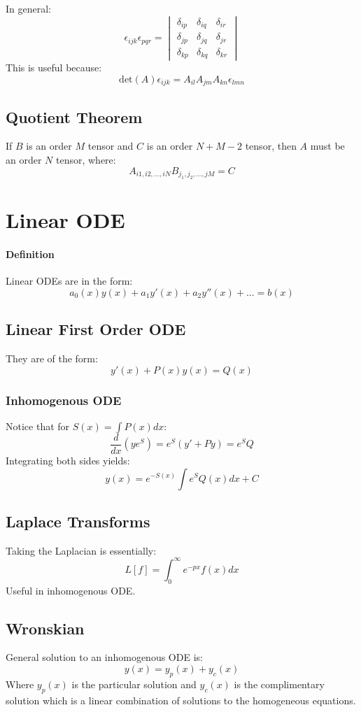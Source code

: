 \documentclass[12pt]{article}
\begin{document}
In general:
\[
\epsilon_{ijk}\epsilon_{pqr} = 
\begin{vmatrix}
\delta_{ip}&\delta_{iq}&\delta_{ir}\\
\delta_{jp}&\delta_{jq}&\delta_{jr}\\
\delta_{kp}&\delta_{kq}&\delta_{kr}
\end{vmatrix}
\]
This is useful because:
\[\text{det}(A)\epsilon_{ijk} = A_{il}A_{jm}A_{kn}\epsilon_{lmn}\]

\subsection{Quotient Theorem}
If $B$ is an order $M$ tensor and $C$ is an order $N+M-2$ tensor, then $A$ must be an order $N$ tensor, where:
\[ A_{i1,i2,...,iN}B_{j_1,j_2,...,jM} = C\]


\section{Linear ODE}

\paragraph{Definition}
Linear ODEs are in the form:
\[ a_0(x)y(x) + a_1y'(x)+a_2y''(x)+...=b(x)\]

\subsection{Linear First Order ODE}
They are of the form:
\[y'(x) + P(x)y(x)=Q(x)\]

\subsubsection{Inhomogenous ODE}
Notice that for $S(x) = \int P(x)dx$:
\[ \frac{d}{dx}(ye^S)= e^S(y' + Py) = e^SQ\]
Integrating both sides yields:
\[y(x) = e^{-S(x)}\int e^S Q(x) dx + C\]

\subsection{Laplace Transforms}
Taking the Laplacian is essentially:
\[ L[f] = \int^\infty_0 e^{-px} f(x)dx\]
Useful in inhomogenous ODE.

\subsection{Wronskian}
General solution to an inhomogenous ODE is:
\[ y(x) = y_p(x) + y_c(x)\]
Where $y_p(x)$ is the particular solution and $y_c(x)$ is the complimentary solution which is a linear combination of solutions to the homogeneous equations. 
\end{document}
